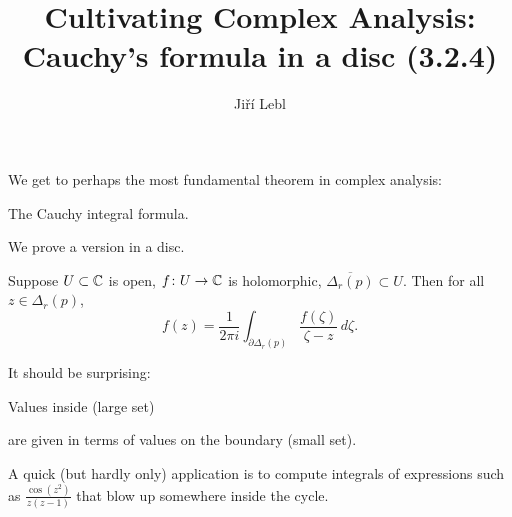 \documentclass[10pt,aspectratio=169]{beamer}
\author{Ji\v{r}\'i Lebl}
\institute[OSU]{%
Departemento pri Matematiko de Oklahoma {\^S}tata Universitato}
\title{Cultivating Complex Analysis:\\%
Cauchy's formula in a disc (3.2.4)}
\date{}
\begin{document}
\begin{frame}
\titlepage
\end{frame}

\begin{frame}

We get to perhaps the most fundamental theorem in complex analysis:

The Cauchy integral formula.

\pause
\medskip

We prove a version in a disc.

\pause
\medskip

\begin{theorem}
Suppose $U \subset {\mathbb{C}}$ is open, $f \colon U \to {\mathbb{C}}$ is holomorphic,
$\overline{\Delta_r(p)} \subset U$.
Then for all $z \in \Delta_r(p)$,
\begin{equation*}
f(z)
=
\frac{1}{2\pi i}
\int_{\partial \Delta_r(p)}
\frac{f(\zeta)}{\zeta-z}
\,
d \zeta .
\end{equation*}
\end{theorem}

\medskip
\pause

It should be surprising:

\pause
\medskip

Values inside (large set)

\pause
are given in terms of values on the boundary (small set).

\medskip
\pause

A quick (but hardly only) application is to compute integrals of expressions
such as $\frac{\cos(z^2)}{z(z-1)}$
that blow up somewhere inside the cycle.

\end{frame}
\end{document}
